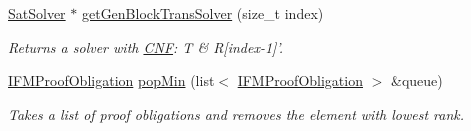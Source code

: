 \begin{DoxyCompactItemize}
\hyperlink{classSatSolver}{Sat\-Solver} $\ast$ \hyperlink{classIFM13Explorer_a04ebb206acd0dcf2d02f2e705eaec358}{get\-Gen\-Block\-Trans\-Solver} (size\-\_\-t index)
\begin{DoxyCompactList}\small\item\em Returns a solver with \hyperlink{classCNF}{C\-N\-F}\-: T \& R\mbox{[}index-\/1\mbox{]}'. \end{DoxyCompactList}\item 
\hyperlink{classIFMProofObligation}{I\-F\-M\-Proof\-Obligation} \hyperlink{classIFM13Explorer_a629b19d6716974b5239dd296de915167}{pop\-Min} (list$<$ \hyperlink{classIFMProofObligation}{I\-F\-M\-Proof\-Obligation} $>$ \&queue)
\begin{DoxyCompactList}\small\item\em Takes a list of proof obligations and removes the element with lowest rank. \end{DoxyCompactList}\end{DoxyCompactItemize}
